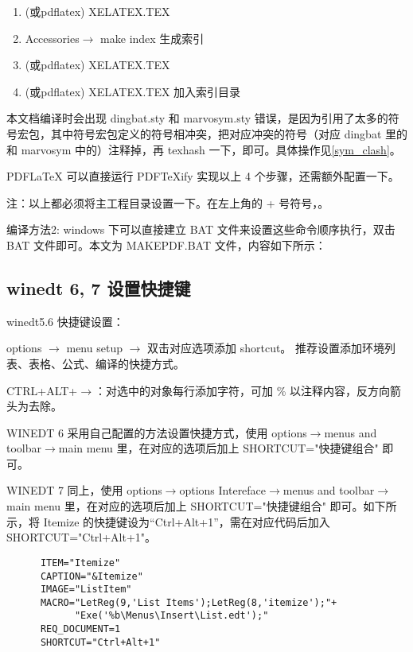 \begin{enumerate}
  \item \XeLaTeX (或pdflatex) XELATEX.TEX
  \item Accessories$\rightarrow$ make index 生成索引
  \item \XeLaTeX (或pdflatex) XELATEX.TEX
  \item \XeLaTeX (或pdflatex) XELATEX.TEX 加入索引目录
\end{enumerate}


本文档编译时会出现 dingbat.sty 和 marvosym.sty 错误，是因为引用了太多的符号宏包，其中符号宏包定义的符号相冲突，把对应冲突的符号（对应 dingbat 里的 和 marvosym 中的）注释掉，再 texhash 一下，即可。具体操作见\ref{sym_clash}。


PDFLaTeX 可以直接运行 PDFTeXify 实现以上 4 个步骤，\XeLaTeX 还需额外配置一下。

注：以上都必须将主工程目录设置一下。在左上角的 + 号符号，。

编译方法2: windows 下可以直接建立 BAT 文件来设置这些命令顺序执行，双击 BAT 文件即可。本文为 MAKEPDF.BAT 文件，内容如下所示：

\subsection{winedt 6, 7 设置快捷键}
\textcolor[rgb]{1.00,0.00,0.00}{winedt5.6 快捷键设置：}

options $\rightarrow$ menu setup $\rightarrow$ 双击对应选项添加 shortcut。
推荐设置添加环境列表、表格、公式、编译的快捷方式。

CTRL+ALT+$\rightarrow$：对选中的对象每行添加字符，可加 \% 以注释内容，反方向箭头为去除。

WINEDT 6 采用自己配置的方法设置快捷方式，使用
options$\rightarrow$menus and toolbar$\rightarrow$main menu 里，在对应的选项后加上 SHORTCUT="快捷键组合" 即可。


WINEDT 7 同上，使用
options$\rightarrow$options Intereface$\rightarrow$menus and toolbar$\rightarrow$main menu 里，在对应的选项后加上 SHORTCUT="快捷键组合" 即可。如下所示，将 Itemize 的快捷键设为“Ctrl+Alt+1”，需在对应代码后加入 SHORTCUT="Ctrl+Alt+1"。

\begin{lstlisting}
      ITEM="Itemize"
      CAPTION="&Itemize"
      IMAGE="ListItem"
      MACRO="LetReg(9,'List Items');LetReg(8,'itemize');"+
            "Exe('%b\Menus\Insert\List.edt');"
      REQ_DOCUMENT=1
      SHORTCUT="Ctrl+Alt+1"
\end{lstlisting}

